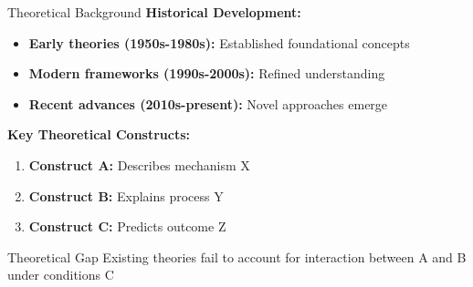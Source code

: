 \documentclass[aspectratio=169,12pt]{beamer}
\begin{document}
\begin{frame}{Theoretical Background}
  \textbf{Historical Development:}
  \begin{itemize}
    \item \textbf{Early theories (1950s-1980s):} Established foundational concepts \cite{foundational1975}
    \item \textbf{Modern frameworks (1990s-2000s):} Refined understanding \cite{refinement2000}
    \item \textbf{Recent advances (2010s-present):} Novel approaches emerge \cite{recent2018}
  \end{itemize}

  \vspace{0.5cm}

  \textbf{Key Theoretical Constructs:}
  \begin{enumerate}
    \item \textbf{Construct A:} Describes mechanism X
    \item \textbf{Construct B:} Explains process Y
    \item \textbf{Construct C:} Predicts outcome Z
  \end{enumerate}

  \vspace{0.5cm}

  \begin{block}{Theoretical Gap}
    Existing theories fail to account for interaction between A and B under conditions C
  \end{block}
\end{frame}
\end{document}
